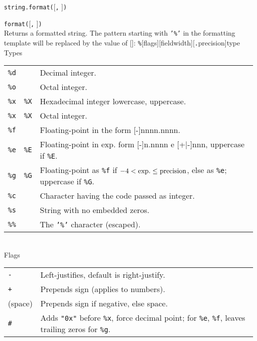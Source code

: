 \hangpar \texttt{string.format(}[\texttt{,} ]\texttt{)}

\hangpar \texttt{format(}[\texttt{,} ]\texttt{)}\\
Returns a formatted string. The pattern starting with \texttt{'\%'} in the formatting template  will be replaced by the value of []: \texttt{\%}[\textsf{flags}][\textsf{fieldwidth}][\texttt{.}\textsf{precision}]\textsf{type}\\

\hangpar \textsf{Types}\\
\begin{tabular}{@{}llp{}}
    \texttt{\%d} & & Decimal integer. \\
    \texttt{\%o} & & Octal integer. \\
    \texttt{\%x} & \texttt{\%X} & Hexadecimal integer lowercase, uppercase. \\
    \texttt{\%x} & \texttt{\%X} & Octal integer. \\
    \texttt{\%f} & & Floating-point in the form [-]nnnn.nnnn. \\
    \texttt{\%e} & \texttt{\%E} & Floating-point in exp. form [-]n.nnnn e [+|-]nnn,
    uppercase if \texttt{\%E}. \\
    \texttt{\%g} & \texttt{\%G} & Floating-point as \texttt{\%f} if $-4<\rm{exp.}\leq precision$, else as \texttt{\%e}; uppercase if \texttt{\%G}. \\
    \texttt{\%c} & & Character having the code passed as integer. \\
    \texttt{\%s} & & String with no embedded zeros. \\
    \texttt{\%\%} & & The \texttt{'\%'} character (escaped). \\
\end{tabular}\\

\hangpar \textsf{Flags}\\
\begin{tabular}{@{}lp{}}
\texttt{-} & Left-justifies, default is right-justify. \\
\texttt{+} & Prepends sign (applies to numbers). \\
(space) & Prepends sign if negative, else space. \\
\texttt{\#} & Adds \texttt{"0x"} before \texttt{\%x}, force decimal point; for \texttt{\%e}, \texttt{\%f}, leaves trailing zeros for \texttt{\%g}. \\
\end{tabular}\\

